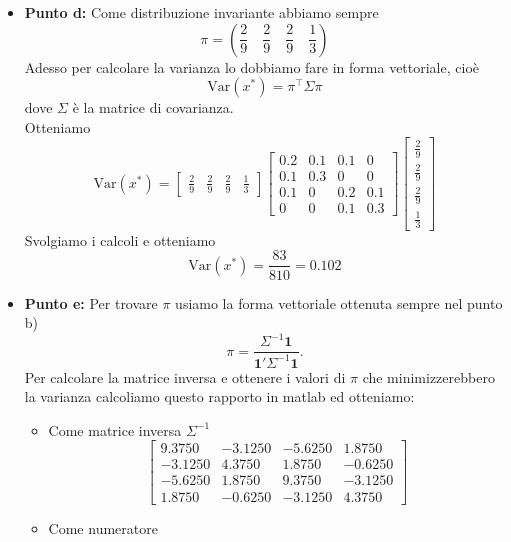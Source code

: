 \documentclass[a4paper,12pt]{article}
\begin{document}
\begin{itemize}
\[		\]
		\item \textbf{Punto d: }
		Come distribuzione invariante abbiamo sempre\\
		\[
		\pi = \left( \frac{2}{9} \quad \frac{2}{9} \quad \frac{2}{9} \quad \frac{1}{3} \right)
		\]
		Adesso per calcolare la varianza lo dobbiamo fare in forma vettoriale, cioè\\
		\[
		\text{Var}(x^*) = \pi^\top \Sigma \pi
		\]
		dove $\Sigma$ è la matrice di covarianza.\\
		Otteniamo \\
		\[
		\text{Var}(x^*) =
		\begin{bmatrix}
			\frac{2}{9} & \frac{2}{9} & \frac{2}{9} & \frac{1}{3} 
		\end{bmatrix}
		\begin{bmatrix}
			0.2 & 0.1 & 0.1 & 0 \\
			0.1 & 0.3 & 0 & 0 \\
			0.1 & 0 & 0.2 & 0.1 \\
			0 & 0 & 0.1 & 0.3
		\end{bmatrix}	
		\begin{bmatrix}
			\frac{2}{9}\\  \frac{2}{9}\\  \frac{2}{9}\\  \frac{1}{3} 
		\end{bmatrix}
		\]
		Svolgiamo i calcoli e otteniamo\\
		\[
		\text{Var}(x^*) = \frac{83}{810}=0.102
		\]
		\item \textbf{Punto e: }
		Per trovare $\pi$ usiamo la forma vettoriale ottenuta sempre nel punto b)\\
		\[
		\pi = \frac{\Sigma^{-1} \mathbf{1}}{\mathbf{1}' \Sigma^{-1} \mathbf{1}}.
		\]
		Per calcolare la matrice inversa e ottenere i valori di $\pi$ che minimizzerebbero la varianza calcoliamo questo rapporto in matlab ed otteniamo:\\
		\begin{itemize}
			\item Come matrice inversa $\Sigma^{-1}$\\
			\[
			\begin{bmatrix}
				9.3750 & -3.1250 & -5.6250 & 1.8750 \\
				-3.1250 & 4.3750 & 1.8750 & -0.6250 \\
				-5.6250 & 1.8750 & 9.3750 & -3.1250 \\
				1.8750 & -0.6250 & -3.1250 & 4.3750
			\end{bmatrix}
			\]
			\item Come numeratore\\

\end{itemize}
\end{itemize}
\end{document}
